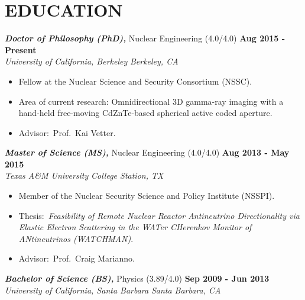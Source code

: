 \section{\small{EDUCATION}}

{\sl\bf Doctor of Philosophy (PhD),} Nuclear Engineering (4.0/4.0) \hfill {\bf Aug 2015 - Present}\\
{\sl University of California, Berkeley} \hfill {\sl Berkeley, CA}\\[-2.8ex]
\vspace{2.5pt}
\begin{itemize}[leftmargin=4ex] \itemsep -2pt %
\item Fellow at the Nuclear Science and Security Consortium (NSSC).
\item Area of current research: Omnidirectional 3D gamma-ray imaging with a hand-held free-moving CdZnTe-based spherical active coded aperture.
\item Advisor:~Prof.~Kai Vetter.
\end{itemize}

{\sl\bf Master of Science (MS),} Nuclear Engineering (4.0/4.0) \hfill {\bf Aug 2013 - May 2015}\\
{\sl Texas A\&M University} \hfill {\sl College Station, TX}\\[-2.8ex]
\vspace{2.5pt}
\begin{itemize}[leftmargin=4ex] \itemsep -2pt %
\item Member of the Nuclear Security Science and Policy Institute (NSSPI).
\item Thesis:~\emph{Feasibility of Remote Nuclear Reactor Antineutrino Directionality via Elastic Electron Scattering in the WATer CHerenkov Monitor of ANtineutrinos (WATCHMAN)}.
\item Advisor:~Prof.~Craig Marianno.
\end{itemize}

{\sl\bf Bachelor of Science (BS),} Physics (3.89/4.0) \hfill {\bf Sep 2009 - Jun 2013} \\
{\sl University of California, Santa Barbara} \hfill {\sl Santa Barbara, CA}\\[-2.8ex]
\vspace{2pt}
